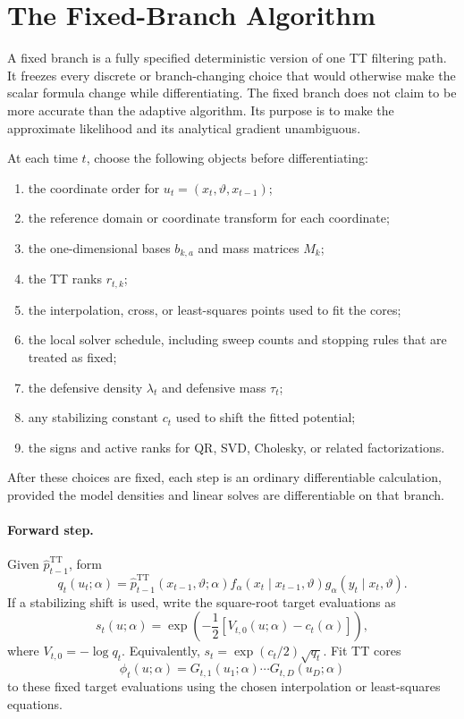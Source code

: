 \documentclass[11pt]{article}
\newcommand{\TT}{\mathrm{TT}}
\theoremstyle{definition}
\theoremstyle{remark}
\begin{document}
\section{The Fixed-Branch Algorithm}

A fixed branch is a fully specified deterministic version of one TT filtering
path.  It freezes every discrete or branch-changing choice that would otherwise
make the scalar formula change while differentiating.  The fixed branch does
not claim to be more accurate than the adaptive algorithm.  Its purpose is to
make the approximate likelihood and its analytical gradient unambiguous.

At each time \(t\), choose the following objects before differentiating:
\begin{enumerate}[leftmargin=*]
\item the coordinate order for \(u_t=(x_t,\vartheta,x_{t-1})\);
\item the reference domain or coordinate transform for each coordinate;
\item the one-dimensional bases \(b_{k,a}\) and mass matrices \(M_k\);
\item the TT ranks \(r_{t,k}\);
\item the interpolation, cross, or least-squares points used to fit the cores;
\item the local solver schedule, including sweep counts and stopping rules
  that are treated as fixed;
\item the defensive density \(\lambda_t\) and defensive mass \(\tau_t\);
\item any stabilizing constant \(c_t\) used to shift the fitted potential;
\item the signs and active ranks for QR, SVD, Cholesky, or related
  factorizations.
\end{enumerate}
After these choices are fixed, each step is an ordinary differentiable
calculation, provided the model densities and linear solves are differentiable
on that branch.

\paragraph{Forward step.}
Given \(\widehat p_{t-1}^{\TT}\), form
\[
  q_t(u_t;\alpha)
  =
  \widehat p_{t-1}^{\TT}(x_{t-1},\vartheta;\alpha)
  f_\alpha(x_t\mid x_{t-1},\vartheta)
  g_\alpha(y_t\mid x_t,\vartheta).
\]
If a stabilizing shift is used, write the square-root target evaluations as
\[
  s_t(u;\alpha)
  =
  \exp\!\left(-\frac12[V_{t,0}(u;\alpha)-c_t(\alpha)]\right),
\]
where \(V_{t,0}=-\log q_t\).  Equivalently,
\(s_t=\exp(c_t/2)\sqrt{q_t}\).  Fit TT cores
\[
  \phi_t(u;\alpha)=G_{t,1}(u_1;\alpha)\cdots G_{t,D}(u_D;\alpha)
\]
to these fixed target evaluations using the chosen interpolation or
least-squares equations.
\end{document}
